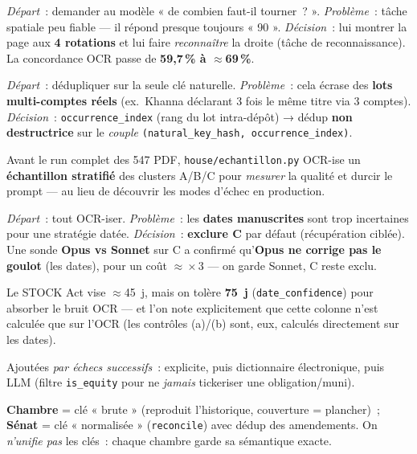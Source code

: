 \documentclass[11pt,a4paper]{article}
\newcommand{\co}[1]{\texttt{\small #1}}
\begin{document}
\begin{description}[leftmargin=0pt,itemsep=4pt]
\item[Deskew OCR.] \emph{Départ}~: demander au modèle « de combien faut-il tourner~? ». \emph{Problème}~:
tâche spatiale peu fiable — il répond presque toujours « 90 ». \emph{Décision}~: lui montrer la page aux
\textbf{4 rotations} et lui faire \emph{reconnaître} la droite (tâche de reconnaissance). La concordance
OCR passe de \textbf{59,7\,\% à $\approx$69\,\%}.
\item[Déduplication.] \emph{Départ}~: dédupliquer sur la seule clé naturelle. \emph{Problème}~: cela
écrase des \textbf{lots multi-comptes réels} (ex.~Khanna déclarant 3 fois le même titre via 3 comptes).
\emph{Décision}~: \co{occurrence_index} (rang du lot intra-dépôt) → dédup \textbf{non destructrice} sur
le \emph{couple} \co{(natural_key_hash, occurrence_index)}.
\item[OCR par échantillon d'abord.] Avant le run complet des 547 PDF, \co{house/echantillon.py}
OCR-ise un \textbf{échantillon stratifié} des clusters A/B/C pour \emph{mesurer} la qualité et durcir le
prompt — au lieu de découvrir les modes d'échec en production.
\item[Cluster C manuscrit.] \emph{Départ}~: tout OCR-iser. \emph{Problème}~: les \textbf{dates
manuscrites} sont trop incertaines pour une stratégie datée. \emph{Décision}~: \textbf{exclure C} par
défaut (récupération ciblée). Une sonde \textbf{Opus vs Sonnet} sur C a confirmé qu'\textbf{Opus ne
corrige pas le goulot} (les dates), pour un coût $\approx\!\times 3$ — on garde Sonnet, C reste exclu.
\item[Fenêtre de plausibilité de date.] Le STOCK Act vise $\approx$45~j, mais on tolère \textbf{75~j}
(\co{date_confidence}) pour absorber le bruit OCR — et l'on note explicitement que cette colonne n'est
calculée que sur l'OCR (les contrôles (a)/(b) sont, eux, calculés directement sur les dates).
\item[Ticker en trois voies.] Ajoutées \emph{par échecs successifs}~: explicite, puis dictionnaire
électronique, puis LLM (filtre \co{is_equity} pour ne \emph{jamais} tickeriser une obligation/muni).
\item[Validation Quiver, deux régimes de clé.] \textbf{Chambre} = clé « brute » (reproduit l'historique,
couverture = plancher)~; \textbf{Sénat} = clé « normalisée » (\co{reconcile}) avec dédup des
amendements. On \emph{n'unifie pas} les clés~: chaque chambre garde sa sémantique exacte.
\end{description}
\end{document}

